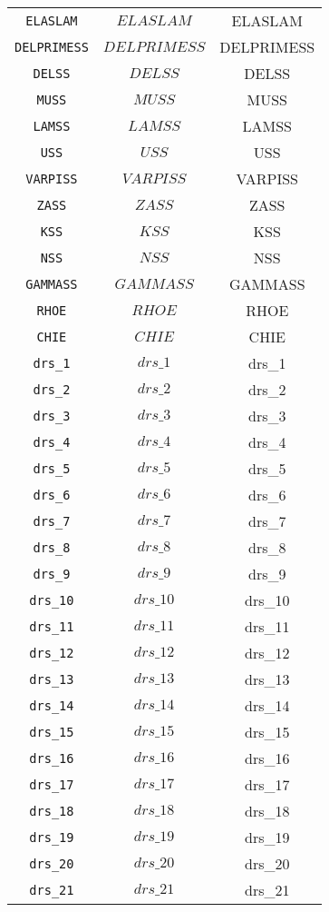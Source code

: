 \begin{center}
\begin{longtable}{ccc}
\texttt{ELASLAM} & $ELASLAM$ & ELASLAM\\
\texttt{DELPRIMESS} & $DELPRIMESS$ & DELPRIMESS\\
\texttt{DELSS} & $DELSS$ & DELSS\\
\texttt{MUSS} & $MUSS$ & MUSS\\
\texttt{LAMSS} & $LAMSS$ & LAMSS\\
\texttt{USS} & $USS$ & USS\\
\texttt{VARPISS} & $VARPISS$ & VARPISS\\
\texttt{ZASS} & $ZASS$ & ZASS\\
\texttt{KSS} & $KSS$ & KSS\\
\texttt{NSS} & $NSS$ & NSS\\
\texttt{GAMMASS} & $GAMMASS$ & GAMMASS\\
\texttt{RHOE} & $RHOE$ & RHOE\\
\texttt{CHIE} & $CHIE$ & CHIE\\
\texttt{drs\_1} & $drs\_1$ & drs\_1\\
\texttt{drs\_2} & $drs\_2$ & drs\_2\\
\texttt{drs\_3} & $drs\_3$ & drs\_3\\
\texttt{drs\_4} & $drs\_4$ & drs\_4\\
\texttt{drs\_5} & $drs\_5$ & drs\_5\\
\texttt{drs\_6} & $drs\_6$ & drs\_6\\
\texttt{drs\_7} & $drs\_7$ & drs\_7\\
\texttt{drs\_8} & $drs\_8$ & drs\_8\\
\texttt{drs\_9} & $drs\_9$ & drs\_9\\
\texttt{drs\_10} & $drs\_10$ & drs\_10\\
\texttt{drs\_11} & $drs\_11$ & drs\_11\\
\texttt{drs\_12} & $drs\_12$ & drs\_12\\
\texttt{drs\_13} & $drs\_13$ & drs\_13\\
\texttt{drs\_14} & $drs\_14$ & drs\_14\\
\texttt{drs\_15} & $drs\_15$ & drs\_15\\
\texttt{drs\_16} & $drs\_16$ & drs\_16\\
\texttt{drs\_17} & $drs\_17$ & drs\_17\\
\texttt{drs\_18} & $drs\_18$ & drs\_18\\
\texttt{drs\_19} & $drs\_19$ & drs\_19\\
\texttt{drs\_20} & $drs\_20$ & drs\_20\\
\texttt{drs\_21} & $drs\_21$ & drs\_21\\

\end{longtable}
\end{center}
